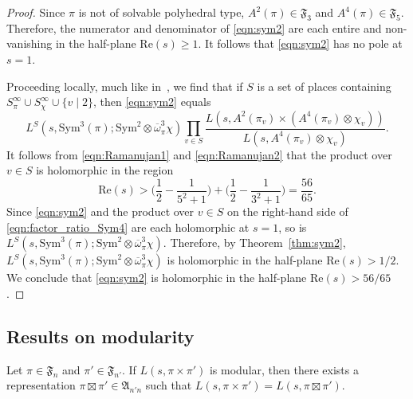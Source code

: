 \documentclass[11pt]{amsart}
\theoremstyle{remark}
\newcommand{\Sym}{\mathrm{Sym}}
\newcommand{\re}{\mathrm{Re}}
\renewcommand{\bar}{\overline}
\numberwithin{equation}{section}
\begin{document}
\begin{proof}
Since $\pi$ is not of solvable polyhedral type, $A^2(\pi)\in\mathfrak{F}_3$ and $A^4(\pi)\in\mathfrak{F}_5$.  Therefore, the numerator and denominator of \eqref{eqn:sym2} are each entire and non-vanishing in the half-plane $\re(s)\geq 1$.  It follows that \eqref{eqn:sym2} has no pole at $s=1$.

Proceeding locally, much like in~\cite[Lemma 7.1]{RamakrishnanWang}, we find that if $S$ is a set of places containing $S_{\pi}^{\infty}\cup S_{\chi}^{\infty}\cup\{v\mid 2\}$, then \eqref{eqn:sym2} equals
\begin{equation}
\label{eqn:factor_ratio_Sym4}
L^S(s,\Sym^3(\pi);\Sym^2\otimes\bar{\omega}_{\pi}^3\chi)\prod_{v\in S}\frac{L(s,A^2(\pi_v)\times(A^4(\pi_v)\otimes\chi_v))}{L(s,A^4(\pi_v)\otimes\chi_v)}.
\end{equation}
It follows from \eqref{eqn:Ramanujan1} and \eqref{eqn:Ramanujan2} that the product over $v\in S$ is holomorphic in the region
\[
\re(s)>\Big(\frac{1}{2}-\frac{1}{5^2+1}\Big)+\Big(\frac{1}{2}-\frac{1}{3^2+1}\Big)=\frac{56}{65}.
\]
Since \eqref{eqn:sym2} and the product over $v\in S$ on the right-hand side of \eqref{eqn:factor_ratio_Sym4} are each holomorphic at $s=1$, so is $L^S(s,\Sym^3(\pi);\Sym^2\otimes\bar{\omega}_{\pi}^3\chi)$.  Therefore, by Theorem~\ref{thm:sym2}, $L^S(s,\Sym^3(\pi);\Sym^2\otimes\bar{\omega}_{\pi}^3\chi)$ is holomorphic in the half-plane $\re(s)>1/2$.  We conclude that \eqref{eqn:sym2} is holomorphic in the half-plane $\re(s)>56/65$.
\end{proof}

\subsection{Results on modularity}

Let $\pi\in\mathfrak{F}_n$ and $\pi'\in\mathfrak{F}_{n'}$.  If $L(s,\pi\times\pi')$ is modular, then there exists a representation $\pi\boxtimes\pi'\in \mathfrak{A}_{n'n}$ such that $L(s,\pi\times\pi')=L(s,\pi\boxtimes\pi')$.
\end{document}
